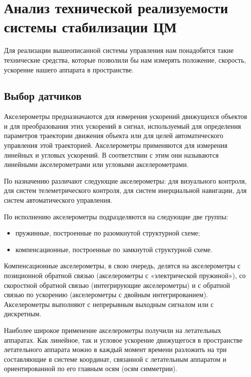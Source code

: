 \section{Анализ технической реализуемости системы стабилизации ЦМ}

Для реализации вышеописанной системы управления нам понадобятся такие технические средства, которые позволили бы нам измерять положение, скорость, ускорение нашего аппарата в пространстве.
\clearpage

\subsection{Выбор датчиков}

Акселерометры предназначаются для измерения ускорений движущихся объектов и для преобразования этих ускорений в сигнал, используемый для определения параметров траектории  движения объекта или для целей автоматического управления этой траекторией. Акселерометры применяются для измерения линейных и угловых ускорений. В соответствии с этим они называются линейными акселерометрами или угловыми акселерометрами.

По назначению различают следующие акселерометры: для визуального контроля, для систем телеметрического контроля, для систем инерциальной навигации, для систем автоматического управления.

По исполнению акселерометры подразделяются на следующие две группы:\begin{itemize}
	\item пружинные, построенные по разомкнутой структурной схеме;
	\item компенсационные, построенные по замкнутой структурной схеме.
\end{itemize}

Компенсационные акселерометры, в свою очередь, делятся на акселерометры с позиционной обратной связью (акселерометры с «электрической пружиной»), со скоростной обратной связью (интегрирующие акселерометры) и с обратной связью по ускорению (акселерометры с двойным интегрированием). Акселерометры выполняют с непрерывным выходным сигналом или с дискретным.

Наиболее широкое применение акселерометры получили на летательных аппаратах. Как линейное, так и угловое ускорение движущегося в пространстве летательного аппарата можно в каждый момент времени разложить на три составляющие в системе координат, связанной с летательным аппаратом и ориентированной по его главным осям (осям симметрии).

